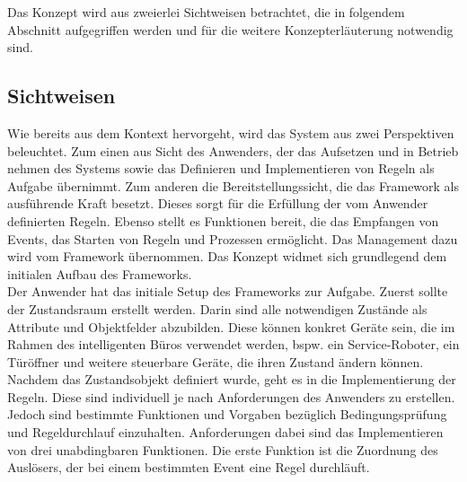         Das Konzept wird aus zweierlei Sichtweisen betrachtet, die in folgendem Abschnitt aufgegriffen werden und für die weitere 
        Konzepterläuterung notwendig sind.
    
    \subsection{Sichtweisen}
    \label{subsec:sichtweisen}
        Wie bereits aus dem Kontext hervorgeht, wird das System aus zwei Perspektiven beleuchtet. Zum einen aus Sicht des Anwenders, 
        der das Aufsetzen und in Betrieb nehmen des Systems sowie das Definieren und Implementieren von Regeln als 
        Aufgabe übernimmt. Zum anderen die 
        Bereitstellungssicht, die das Framework als ausführende Kraft besetzt. Dieses sorgt für die Erfüllung der vom 
        Anwender definierten Regeln. Ebenso stellt es Funktionen bereit, die das Empfangen von Events, das Starten 
        von Regeln und Prozessen ermöglicht. Das Management dazu wird vom Framework übernommen. 
        Das Konzept widmet sich grundlegend dem initialen Aufbau des Frameworks. 
        \\
        \linebreak
        Der Anwender hat das initiale Setup des Frameworks zur Aufgabe. Zuerst sollte der Zustandsraum erstellt werden. 
        Darin sind alle notwendigen Zustände als Attribute und Objektfelder abzubilden. Diese können konkret Geräte sein, die im Rahmen des 
        intelligenten Büros verwendet werden, bspw. ein Service-Roboter, ein Türöffner und weitere steuerbare Geräte, die 
        ihren Zustand ändern können. Nachdem das Zustandsobjekt 
        definiert wurde, geht es in die Implementierung der Regeln. Diese sind individuell je nach 
        Anforderungen des Anwenders zu erstellen. Jedoch sind bestimmte Funktionen und Vorgaben bezüglich Bedingungsprüfung 
        und Regeldurchlauf einzuhalten. Anforderungen dabei sind das Implementieren von drei unabdingbaren Funktionen. 
        Die erste Funktion ist die Zuordnung des Auslösers, der bei einem bestimmten Event eine Regel durchläuft. 
